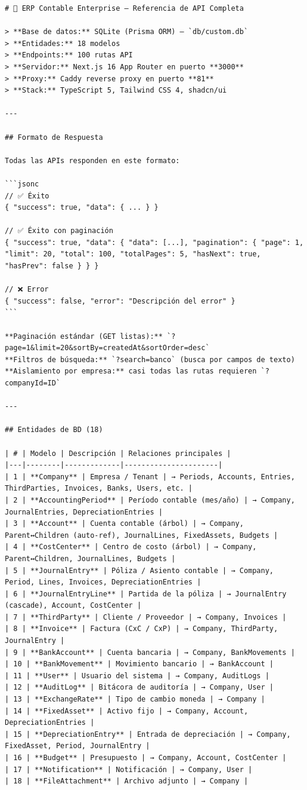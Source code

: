 \documentclass[12pt, a4paper, oneside]{book}
\begin{document}
\begin{lstlisting}
# 📒 ERP Contable Enterprise — Referencia de API Completa

> **Base de datos:** SQLite (Prisma ORM) — `db/custom.db`  
> **Entidades:** 18 modelos  
> **Endpoints:** 100 rutas API  
> **Servidor:** Next.js 16 App Router en puerto **3000**  
> **Proxy:** Caddy reverse proxy en puerto **81**  
> **Stack:** TypeScript 5, Tailwind CSS 4, shadcn/ui  

---

## Formato de Respuesta

Todas las APIs responden en este formato:

```jsonc
// ✅ Éxito
{ "success": true, "data": { ... } }

// ✅ Éxito con paginación
{ "success": true, "data": { "data": [...], "pagination": { "page": 1, "limit": 20, "total": 100, "totalPages": 5, "hasNext": true, "hasPrev": false } } }

// ❌ Error
{ "success": false, "error": "Descripción del error" }
```

**Paginación estándar (GET listas):** `?page=1&limit=20&sortBy=createdAt&sortOrder=desc`  
**Filtros de búsqueda:** `?search=banco` (busca por campos de texto)  
**Aislamiento por empresa:** casi todas las rutas requieren `?companyId=ID`

---

## Entidades de BD (18)

| # | Modelo | Descripción | Relaciones principales |
|---|--------|-------------|----------------------|
| 1 | **Company** | Empresa / Tenant | → Periods, Accounts, Entries, ThirdParties, Invoices, Banks, Users, etc. |
| 2 | **AccountingPeriod** | Período contable (mes/año) | → Company, JournalEntries, DepreciationEntries |
| 3 | **Account** | Cuenta contable (árbol) | → Company, Parent↔Children (auto-ref), JournalLines, FixedAssets, Budgets |
| 4 | **CostCenter** | Centro de costo (árbol) | → Company, Parent↔Children, JournalLines, Budgets |
| 5 | **JournalEntry** | Póliza / Asiento contable | → Company, Period, Lines, Invoices, DepreciationEntries |
| 6 | **JournalEntryLine** | Partida de la póliza | → JournalEntry (cascade), Account, CostCenter |
| 7 | **ThirdParty** | Cliente / Proveedor | → Company, Invoices |
| 8 | **Invoice** | Factura (CxC / CxP) | → Company, ThirdParty, JournalEntry |
| 9 | **BankAccount** | Cuenta bancaria | → Company, BankMovements |
| 10 | **BankMovement** | Movimiento bancario | → BankAccount |
| 11 | **User** | Usuario del sistema | → Company, AuditLogs |
| 12 | **AuditLog** | Bitácora de auditoría | → Company, User |
| 13 | **ExchangeRate** | Tipo de cambio moneda | → Company |
| 14 | **FixedAsset** | Activo fijo | → Company, Account, DepreciationEntries |
| 15 | **DepreciationEntry** | Entrada de depreciación | → Company, FixedAsset, Period, JournalEntry |
| 16 | **Budget** | Presupuesto | → Company, Account, CostCenter |
| 17 | **Notification** | Notificación | → Company, User |
| 18 | **FileAttachment** | Archivo adjunto | → Company |


\end{lstlisting}
\end{document}
